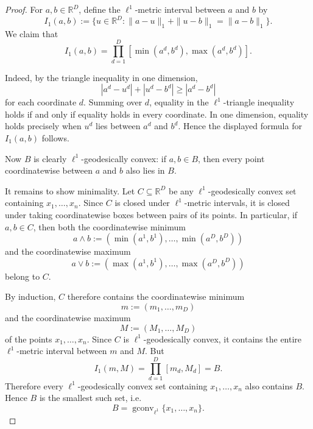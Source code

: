 \documentclass[11pt]{article}
\begin{document}
\begin{proof}
For \(a,b\in \mathbb{R}^D\), define the \(\ell^1\)-metric interval between
\(a\) and \(b\) by
\[
I_1(a,b)
:=
\{u\in\mathbb{R}^D:
\|a-u\|_1+\|u-b\|_1=\|a-b\|_1\}.
\]
We claim that
\[
I_1(a,b)
=
\prod_{d=1}^D
[\min(a^d,b^d),\max(a^d,b^d)].
\]

Indeed, by the triangle inequality in one dimension,
\[
|a^d-u^d|+|u^d-b^d|\ge |a^d-b^d|
\]
for each coordinate \(d\). Summing over \(d\), equality in the
\(\ell^1\)-triangle inequality holds if and only if equality holds in every
coordinate. In one dimension, equality holds precisely when \(u^d\) lies
between \(a^d\) and \(b^d\). Hence the displayed formula for \(I_1(a,b)\)
follows.

Now \(B\) is clearly \(\ell^1\)-geodesically convex: if \(a,b\in B\), then
every point coordinatewise between \(a\) and \(b\) also lies in \(B\).

It remains to show minimality. Let \(C\subseteq \mathbb{R}^D\) be any
\(\ell^1\)-geodesically convex set containing \(x_1,\dots,x_n\). Since
\(C\) is closed under \(\ell^1\)-metric intervals, it is closed under taking
coordinatewise boxes between pairs of its points. In particular, if
\(a,b\in C\), then both the coordinatewise minimum
\[
a\wedge b
:=
(\min(a^1,b^1),\dots,\min(a^D,b^D))
\]
and the coordinatewise maximum
\[
a\vee b
:=
(\max(a^1,b^1),\dots,\max(a^D,b^D))
\]
belong to \(C\).

By induction, \(C\) therefore contains the coordinatewise minimum
\[
m:=(m_1,\dots,m_D)
\]
and the coordinatewise maximum
\[
M:=(M_1,\dots,M_D)
\]
of the points \(x_1,\dots,x_n\). Since \(C\) is \(\ell^1\)-geodesically
convex, it contains the entire \(\ell^1\)-metric interval between \(m\) and
\(M\). But
\[
I_1(m,M)
=
\prod_{d=1}^D [m_d,M_d]
=
B.
\]
Therefore every \(\ell^1\)-geodesically convex set containing
\(x_1,\dots,x_n\) also contains \(B\). Hence \(B\) is the smallest such set,
i.e.
\[
B=\operatorname{gconv}_{\ell^1}\{x_1,\dots,x_n\}.
\]
\end{proof}
\end{document}
